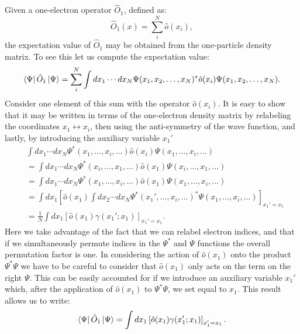\documentclass[../Main/chem532-notes.tex]{subfiles}
\begin{document}
Given a one-electron operator $\hat{O}_1$, defined as:
\begin{equation}
\hat{O}_1(x) = \sum_i^N \hat{o}(x_i),
\end{equation}
the expectation value of $\hat{O}_1$ may be obtained from the one-particle density matrix.
To see this let us compute the expectation value:
\begin{equation}
\bra{\Psi}\hat{O}_1 \ket{\Psi}
= \sum_i^N  \int dx_1 \cdots dx_N \Psi(x_1,x_2,\ldots,x_N)^* \hat{o}(x_i) \Psi(x_1,x_2,\ldots,x_N).
\end{equation}
Consider one element of this sum with the operator $\hat{o}(x_i)$.
It is easy to show that it may be written in terms of the one-electron density matrix by relabeling the  coordinates $x_1 \leftrightarrow x_i$, then using the anti-symmetry of the wave function, and lastly, by introducing the auxiliary variable $x_1'$
\begin{equation}
\begin{split}
&\int dx_1 \cdots dx_N \Psi^*(x_1,\ldots,x_i,\ldots) \hat{o}(x_i) \Psi(x_1,\ldots,x_i,\ldots) \\
&= \int dx_1 \cdots dx_N \Psi^*(x_i,\ldots,x_1,\ldots) \hat{o}(x_1) \Psi(x_i,\ldots,x_1,\ldots)\\
&= \int dx_1 \cdots dx_N \Psi^*(x_1,\ldots,x_i,\ldots) \hat{o}(x_1) \Psi(x_1,\ldots,x_i,\ldots)\\
&= \int dx_1 \left[ \hat{o}(x_1) \int dx_2 \cdots dx_N \Psi^*(x_1',\ldots,x_i,\ldots)^* \Psi(x_1,\ldots,x_i,\ldots) \right]_{x_1' = x_1}\\
&= \frac{1}{N} \int dx_1 \left[ \hat{o}(x_1) \gamma(x_1';x_1) \right]_{x_1' = x_1}.
\end{split}
\end{equation}
Here we take advantage of the fact that we can relabel electron indices, and that if we simultaneously permute indices in the $\Psi^*$ and $\Psi$ functions the overall permutation factor is one. In considering the action of $\hat{o}(x_1)$ onto the product $\Psi^* \Psi$ we have to be careful to consider that $\hat{o}(x_1)$ only acts on the term on the right $\Psi$. This can be easily accounted for if we introduce an auxiliary variable $x_1'$ which, after the application of $\hat{o}(x_1)$ to $\Psi^* \Psi$, we set equal to $x_1$.
This result allows us to write:
\begin{equation}
\bra{\Psi}\hat{O}_1 \ket{\Psi}
= \int dx_1 \left[ \hat{o}(x_1) \gamma(x_1';x_1) \right]_{x_1' = x_1}.
\end{equation}
\end{document}
